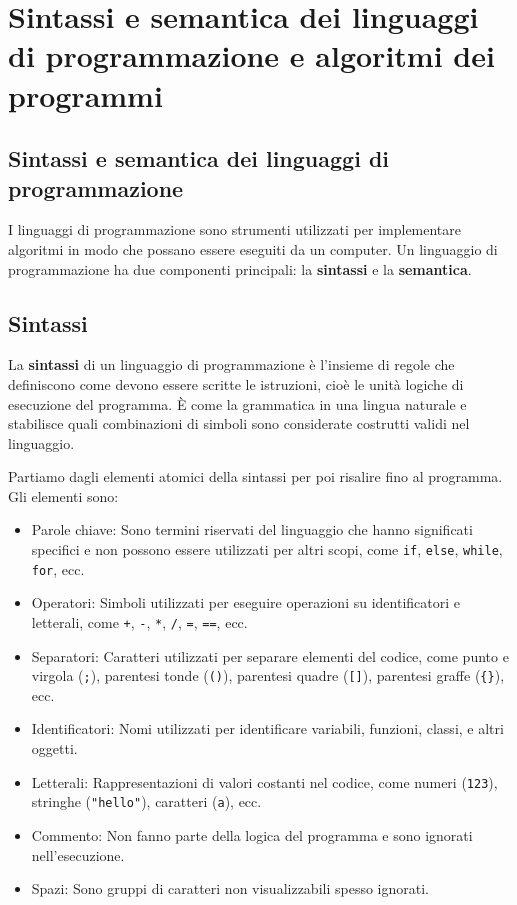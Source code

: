 \documentclass[
  letterpaper,
  DIV=11,
  numbers=noendperiod]{scrreprt}
\providecommand{\tightlist}{%
  \setlength{\itemsep}{0pt}\setlength{\parskip}{0pt}}\usepackage{longtable,booktabs,array}
\begin{document}
\chapter{Sintassi e semantica dei linguaggi di programmazione e
algoritmi dei
programmi}\label{sintassi-e-semantica-dei-linguaggi-di-programmazione-e-algoritmi-dei-programmi}

\section{Sintassi e semantica dei linguaggi di
programmazione}\label{sintassi-e-semantica-dei-linguaggi-di-programmazione}

I linguaggi di programmazione sono strumenti utilizzati per implementare
algoritmi in modo che possano essere eseguiti da un computer. Un
linguaggio di programmazione ha due componenti principali: la
\textbf{sintassi} e la \textbf{semantica}.

\section{Sintassi}\label{sintassi}

La \textbf{sintassi} di un linguaggio di programmazione è l'insieme di
regole che definiscono come devono essere scritte le istruzioni, cioè le
unità logiche di esecuzione del programma. È come la grammatica in una
lingua naturale e stabilisce quali combinazioni di simboli sono
considerate costrutti validi nel linguaggio.

Partiamo dagli elementi atomici della sintassi per poi risalire fino al
programma. Gli elementi sono:

\begin{itemize}
\tightlist
\item
  Parole chiave: Sono termini riservati del linguaggio che hanno
  significati specifici e non possono essere utilizzati per altri scopi,
  come \texttt{if}, \texttt{else}, \texttt{while}, \texttt{for}, ecc.
\item
  Operatori: Simboli utilizzati per eseguire operazioni su
  identificatori e letterali, come \texttt{+}, \texttt{-}, \texttt{*},
  \texttt{/}, \texttt{=}, \texttt{==}, ecc.
\item
  Separatori: Caratteri utilizzati per separare elementi del codice,
  come punto e virgola (\texttt{;}), parentesi tonde (\texttt{()}),
  parentesi quadre (\texttt{{[}{]}}), parentesi graffe (\texttt{\{\}}),
  ecc.
\item
  Identificatori: Nomi utilizzati per identificare variabili, funzioni,
  classi, e altri oggetti.
\item
  Letterali: Rappresentazioni di valori costanti nel codice, come numeri
  (\texttt{123}), stringhe (\texttt{"hello"}), caratteri
  (\texttt{\textquotesingle{}a\textquotesingle{}}), ecc.
\item
  Commento: Non fanno parte della logica del programma e sono ignorati
  nell'esecuzione.
\item
  Spazi: Sono gruppi di caratteri non visualizzabili spesso ignorati.
\end{itemize}
\end{document}
